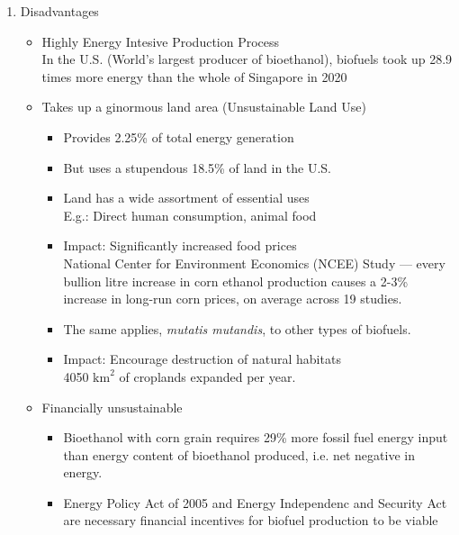 \documentclass[oneside]{book}
\begin{document}
\begin{enumerate}
\begin{enumerate}
\begin{enumerate}
\begin{itemize}
            \end{itemize}
            \item Disadvantages \begin{itemize}
                \item Highly Energy Intesive Production Process\\[2mm] In the U.S. (World's largest producer of bioethanol), biofuels took up 28.9 times more energy than the whole of Singapore in 2020
                \item Takes up a ginormous land area (Unsustainable Land Use)\\[2mm]
                \begin{itemize}
                    \item Provides 2.25\% of total energy generation
                    \item But uses a stupendous 18.5\% of land in the U.S.
                    \item Land has a wide assortment of essential uses\\[2mm]
                    E.g.: Direct human consumption, animal food
                    \item Impact: Significantly increased food prices\\[2mm]
                    National Center for Environment Economics (NCEE) Study --- every bullion litre increase in corn ethanol production causes a 2-3\% increase in long-run corn prices, on average across 19 studies.
                    \item The same applies, \emph{mutatis mutandis}, to other types of biofuels. 
                    \item Impact: Encourage destruction of natural habitats\\[2mm]
                    4050 \(\text{km}^2\) of croplands expanded per year.
                \end{itemize}
                \item Financially unsustainable \begin{itemize}
                    \item Bioethanol with corn grain requires 29\% more fossil fuel energy input than energy content of bioethanol produced, i.e. net negative in energy.
                    \item Energy Policy Act of 2005 and Energy Independenc and Security Act are necessary financial incentives for biofuel production to be viable
                \end{itemize}

\end{itemize}
\end{enumerate}
\end{enumerate}
\end{enumerate}
\end{document}
